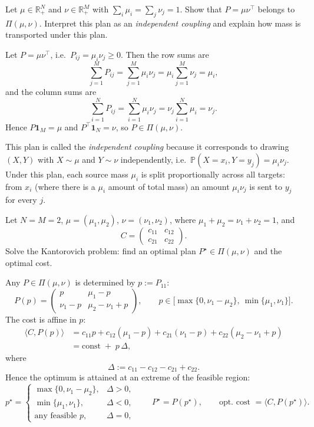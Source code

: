 \begin{exercise}
Let \(\mu\in\mathbb{R}^N_+\) and \(\nu\in\mathbb{R}^M_+\) with \(\sum_i\mu_i=\sum_j\nu_j=1\).
Show that \(P=\mu\nu^\top\) belongs to \(\Pi(\mu,\nu)\). Interpret this plan as an
\emph{independent coupling} and explain how mass is transported under this plan.
\end{exercise}

\begin{solution}
Let $P=\mu\nu^\top$, i.e.\ $P_{ij}=\mu_i\nu_j\ge 0$. Then the row sums are
\[
\sum_{j=1}^M P_{ij}=\sum_{j=1}^M \mu_i\nu_j=\mu_i\sum_{j=1}^M \nu_j=\mu_i,
\]
and the column sums are
\[
\sum_{i=1}^N P_{ij}=\sum_{i=1}^N \mu_i\nu_j=\nu_j\sum_{i=1}^N \mu_i=\nu_j.
\]
Hence $P\mathbf 1_M=\mu$ and $P^\top \mathbf 1_N=\nu$, so $P\in\Pi(\mu,\nu)$.

This plan is called the \emph{independent coupling} because it corresponds to drawing
$(X,Y)$ with $X\sim\mu$ and $Y\sim\nu$ independently, i.e.\ $\mathbb P(X=x_i,Y=y_j)=\mu_i\nu_j$.
Under this plan, each source mass $\mu_i$ is split proportionally across all targets:
from $x_i$ (where there is a $\mu_i$ amount of total mass) an amount $\mu_i\nu_j$ is sent to $y_j$ for every $j$.
\end{solution}


\begin{exercise}
Let \(N=M=2\), \(\mu=(\mu_1,\mu_2)\), \(\nu=(\nu_1,\nu_2)\), where $\mu_1+\mu_2=\nu_1+\nu_2=1$, and
\[
C=\begin{pmatrix}
c_{11} & c_{12}\\
c_{21} & c_{22}
\end{pmatrix}.
\]
Solve the Kantorovich problem: find an optimal plan \(P^\star\in\Pi(\mu,\nu)\) and the
optimal cost.
\end{exercise}

\begin{solution}
Any $P\in\Pi(\mu,\nu)$ is determined by $p:=P_{11}$:
\[
P(p)=
\begin{pmatrix}
p & \mu_1-p\\
\nu_1-p & \mu_2-\nu_1+p
\end{pmatrix},
\qquad 
p\in\big[\max\{0,\nu_1-\mu_2\},\ \min\{\mu_1,\nu_1\}\big].
\]
The cost is affine in $p$:
\begin{align*}
\langle C,P(p)\rangle
&= c_{11}p+c_{12}(\mu_1-p)+c_{21}(\nu_1-p)+c_{22}(\mu_2-\nu_1+p)\\
&= \text{const} \;+\; p\,\Delta,
\end{align*}
where
\[
\Delta := c_{11}-c_{12}-c_{21}+c_{22}.
\]
Hence the optimum is attained at an extreme of the feasible region:
\[
p^\star=
\begin{cases}
\max\{0,\nu_1-\mu_2\}, & \Delta>0,\\[2pt]
\min\{\mu_1,\nu_1\}, & \Delta<0,\\[2pt]
\text{any feasible }p, & \Delta=0,
\end{cases}
\qquad
P^\star=P(p^\star),
\qquad
\text{opt.\ cost }=\langle C,P(p^\star)\rangle.
\]

\end{solution}




